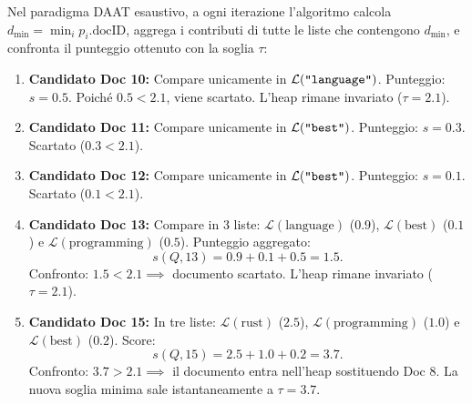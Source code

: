 Nel paradigma DAAT esaustivo, a ogni iterazione l'algoritmo calcola $d_{\min} = \min_{i} p_i.\text{docID}$, aggrega i contributi di tutte le liste che contengono $d_{\min}$, e confronta il punteggio ottenuto con la soglia $\tau$:
\begin{enumerate}
    \item \textbf{Candidato Doc 10:} Compare unicamente in $\mathcal{L}(\text{\texttt{"language"}})$. Punteggio: $s = 0.5$. Poich\'e $0.5 < 2.1$, viene scartato. L'heap rimane invariato ($\tau = 2.1$).
    \item \textbf{Candidato Doc 11:} Compare unicamente in $\mathcal{L}(\text{\texttt{"best"}})$. Punteggio: $s = 0.3$. Scartato ($0.3 < 2.1$).
    \item \textbf{Candidato Doc 12:} Compare unicamente in $\mathcal{L}(\text{\texttt{"best"}})$. Punteggio: $s = 0.1$. Scartato ($0.1 < 2.1$).
    \item \textbf{Candidato Doc 13:} Compare in 3 liste: $\mathcal{L}(\text{language})$ ($0.9$), $\mathcal{L}(\text{best})$ ($0.1$) e $\mathcal{L}(\text{programming})$ ($0.5$). Punteggio aggregato:
    \begin{equation*}
        s(Q, 13) = 0.9 + 0.1 + 0.5 = 1.5.
    \end{equation*}
    Confronto: $1.5 < 2.1 \implies$ documento scartato. L'heap rimane invariato ($\tau = 2.1$).
    \item \textbf{Candidato Doc 15:} In tre liste: $\mathcal{L}(\text{rust})$ ($2.5$), $\mathcal{L}(\text{programming})$ ($1.0$) e $\mathcal{L}(\text{best})$ ($0.2$). Score:
    \begin{equation*}
        s(Q, 15) = 2.5 + 1.0 + 0.2 = 3.7.
    \end{equation*}
    Confronto: $3.7 > 2.1 \implies$ il documento entra nell'heap sostituendo Doc 8. La nuova soglia minima sale istantaneamente a $\tau = 3.7$.
\end{enumerate}

